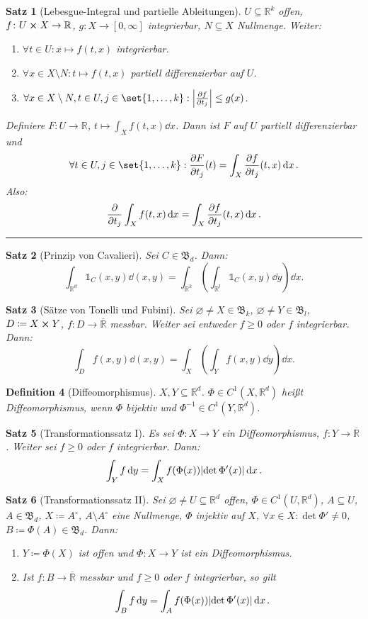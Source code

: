 \documentclass[a4paper]{article}
\newcounter{Sec}
\theoremstyle{marginbreak}
\newtheorem{definition}{Definition}[Sec]
\newtheorem{satz}[definition]{Satz}
\newcommand{\sep}{%
	\rule{\textwidth}{0.3pt}%
	\stepcounter{Sec}%
	}
\newcommand{\R}{\mathbb{R}}
\newcommand{\B}{\mathfrak{B}}
\begin{document}
	\begin{satz}[Lebesgue-Integral und partielle Ableitungen]
		$U\subseteq\R^k$ offen, $f\colon U\cross X\to\R$, $g\colon X\to[0,\infty]$ integrierbar,
		$N\subseteq X$ Nullmenge. Weiter:
		\begin{enumerate}[label=(\alph*)]
			\item $\forall t\in U: x\mapsto f(t, x)$ integrierbar.
			\item $\forall x\in X\setminus N: t\mapsto f(t, x)$ partiell differenzierbar auf $U$.
			\item $\forall x\in X\setminus N, t\in U, j\in\set{1,\ldots,k}: \abs{\pdv{f}{t_j}}\leq g(x)$.
		\end{enumerate}
		Definiere $F\colon U\to\R$, $t\mapsto \int_Xf(t, x)\dd{x}$. Dann ist $F$ auf $U$ partiell
		differenzierbar und
		\[
			\forall t\in U, j\in\set{1,\ldots,k}:{\pdv{F}{t_j}}(t)=\int_X{\pdv{f}{t_j}}(t, x)\dd{x}.
		\]
		Also:
		\[
			\pdv{t_j}\int_Xf(t, x)\dd{x} = \int_X{\pdv{f}{t_j}}(t, x)\dd{x}.
		\]
	\end{satz}
	\sep
	\begin{satz}[Prinzip von Cavalieri]
		Sei $C\in\B_d$. Dann:
		\[
			\int_{\R^d}\mathds{1}_C(x, y)\dd{(x, y)}=\int_{\R^k}\left(\int_{\R^l}\mathds{1}_C(x, y)\dd{y}\right)\dd{x}.
		\]
	\end{satz}
	\begin{satz}[Sätze von Tonelli und Fubini]
		Sei $\varnothing\neq X\in\B_k$, $\varnothing\neq Y\in\B_l$, $D\coloneqq X\cross Y$, $f\colon D\to\overline{\R}$ messbar.
		Weiter sei entweder $f\geq 0$ oder $f$ integrierbar. Dann:
		\[
			\int_Df(x, y)\dd{(x, y)} = \int_X\left(\int_Yf(x, y)\dd{y}\right)\dd{x}.
		\]
	\end{satz}
	\begin{definition}[Diffeomorphismus]
		$X, Y\subseteq\R^d$. $\Phi\in C^1(X,\R^d)$ heißt Diffeomorphismus, wenn $\Phi$ bijektiv
		und $\Phi^{-1}\in C^1(Y,\R^d)$.
	\end{definition}
	\begin{satz}[Transformationssatz I]
		Es sei $\Phi\colon X\to Y$ ein Diffeomorphismus, $f\colon Y\to\overline{\R}$.
		Weiter sei $f\geq 0$ oder $f$ integrierbar. Dann:
		\[
			\int_Yf\dd{y} = \int_Xf(\Phi(x))\abs{\det\Phi'(x)}\dd{x}.
		\]
	\end{satz}
	\begin{satz}[Transformationssatz II]
		Sei $\varnothing\neq U\subseteq\R^d$ offen, $\Phi\in C^1(U, \R^d)$, $A\subseteq U$,
		$A\in\B_d$, $X\coloneqq A^\circ$, $A\setminus A^\circ$ eine Nullmenge, $\Phi$ injektiv auf $X$,
		$\forall x\in X:\det\Phi'\neq 0$, $B\coloneqq\Phi(A)\in\B_d$. Dann:
		\begin{enumerate}[label=(\alph*)]
			\item $Y\coloneqq \Phi(X)$ ist offen und $\Phi\colon X\to Y$ ist ein Diffeomorphismus.
			\item Ist $f\colon B\to\overline{\R}$ messbar und $f\geq 0$ oder $f$ integrierbar, so gilt
			\[
				\int_Bf\dd{y}=\int_Af(\Phi(x))\abs{\det\Phi'(x)}\dd{x}.
			\]
		\end{enumerate}
	\end{satz}
\end{document}
